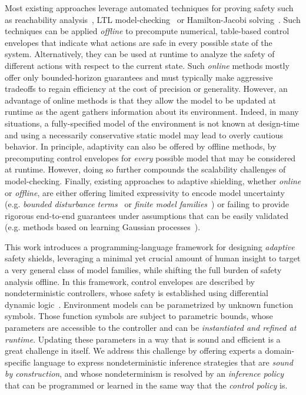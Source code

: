 \documentclass[acmsmall,screen,nonacm]{acmart}
\begin{document}
Most existing approaches leverage automated techniques for proving safety such as reachability analysis~\cite{DBLP:conf/icra/ThummA22,DBLP:conf/cdc/KollerBT018}, LTL model-checking~\cite{DBLP:conf/aaai/AlshiekhBEKNT18,DBLP:conf/isola/KonighoferL0B20} or Hamilton-Jacobi solving~\cite{DBLP:journals/tac/FisacAZKGT19}. Such techniques can be applied \emph{offline} to precompute numerical, table-based control envelopes that indicate what actions are safe in every possible state of the system. Alternatively, they can be used at runtime to analyze the safety of different actions with respect to the current state. Such \emph{online} methods mostly offer only bounded-horizon guarantees and must typically make aggressive tradeoffs to regain efficiency at the cost of precision or generality. However, an advantage of online methods is that they allow the model to be updated at runtime as the agent gathers information about its environment. Indeed, in many situations, a fully-specified model of the environment is not known at design-time and using a necessarily conservative static model may lead to overly cautious behavior. In principle, adaptivity can also be offered by offline methods, by precomputing control envelopes for \emph{every} possible model that may be considered at runtime. However, doing so further compounds the scalability challenges of model-checking. Finally, existing approaches to adaptive shielding, whether \emph{online} or \emph{offline}, are either offering limited expressivity to encode model uncertainty (e.g. \emph{bounded disturbance terms}~\cite{althoff2014online} or \emph{finite model families}~\cite{DBLP:conf/tacas/FultonP19}) or failing to provide rigorous end-to-end guarantees under assumptions that can be easily validated (e.g. methods based on learning Gaussian processes~\cite{DBLP:conf/aaai/ChengOMB19,DBLP:conf/eucc/BerkenkampS15,DBLP:conf/nips/BerkenkampTS017,DBLP:journals/tac/FisacAZKGT19}).

This work introduces a programming-language framework for designing \emph{adaptive} safety shields, leveraging a minimal yet crucial amount of human insight to target a very general class of model families, while shifting the full burden of safety analysis offline. In this framework, control envelopes are described by nondeterministic controllers, whose safety is established using differential dynamic logic~\cite{DBLP:journals/jar/Platzer08,DBLP:journals/jar/Platzer17}. Environment models can be parametrized by unknown function symbols. Those function symbols are subject to parametric bounds, whose parameters are accessible to the controller and can be \emph{instantiated and refined at runtime}. Updating these parameters in a way that is sound and efficient is a great challenge in itself. We address this challenge by offering experts a domain-specific language to express nondeterministic inference strategies that are \emph{sound by construction}, and whose nondeterminism is resolved by an \emph{inference policy} that can be programmed or learned in the same way that the \emph{control policy} is.
\end{document}
